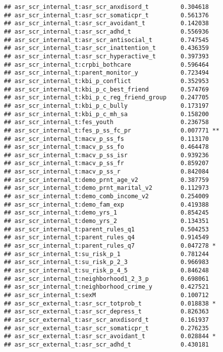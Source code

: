 \documentclass[
]{article}
\begin{document}
\begin{verbatim}
## asr_scr_internal_t:asr_scr_anxdisord_t         0.304618    
## asr_scr_internal_t:asr_scr_somaticpr_t         0.561376    
## asr_scr_internal_t:asr_scr_avoidant_t          0.142038    
## asr_scr_internal_t:asr_scr_adhd_t              0.556936    
## asr_scr_internal_t:asr_scr_antisocial_t        0.747545    
## asr_scr_internal_t:asr_scr_inattention_t       0.436359    
## asr_scr_internal_t:asr_scr_hyperactive_t       0.397393    
## asr_scr_internal_t:crpbi_bothcare              0.596464    
## asr_scr_internal_t:parent_monitor_y            0.723494    
## asr_scr_internal_t:kbi_p_conflict              0.352953    
## asr_scr_internal_t:kbi_p_c_best_friend         0.574769    
## asr_scr_internal_t:kbi_p_c_reg_friend_group    0.247705    
## asr_scr_internal_t:kbi_p_c_bully               0.173197    
## asr_scr_internal_t:kbi_p_c_mh_sa               0.158200    
## asr_scr_internal_t:fes_youth                   0.236758    
## asr_scr_internal_t:fes_p_ss_fc_pr              0.007771 ** 
## asr_scr_internal_t:macv_p_ss_fs                0.113170    
## asr_scr_internal_t:macv_p_ss_fo                0.464478    
## asr_scr_internal_t:macv_p_ss_isr               0.939236    
## asr_scr_internal_t:macv_p_ss_fr                0.859207    
## asr_scr_internal_t:macv_p_ss_r                 0.842084    
## asr_scr_internal_t:demo_prnt_age_v2            0.387759    
## asr_scr_internal_t:demo_prnt_marital_v2        0.112973    
## asr_scr_internal_t:demo_comb_income_v2         0.254009    
## asr_scr_internal_t:demo_fam_exp                0.419388    
## asr_scr_internal_t:demo_yrs_1                  0.854245    
## asr_scr_internal_t:demo_yrs_2                  0.134351    
## asr_scr_internal_t:parent_rules_q1             0.504253    
## asr_scr_internal_t:parent_rules_q4             0.914549    
## asr_scr_internal_t:parent_rules_q7             0.047278 *  
## asr_scr_internal_t:su_risk_p_1                 0.781244    
## asr_scr_internal_t:su_risk_p_2_3               0.966983    
## asr_scr_internal_t:su_risk_p_4_5               0.846248    
## asr_scr_internal_t:neighborhood1_2_3_p         0.698061    
## asr_scr_internal_t:neighborhood_crime_y        0.427521    
## asr_scr_internal_t:sexM                        0.100712    
## asr_scr_external_t:asr_scr_totprob_t           0.018838 *  
## asr_scr_external_t:asr_scr_depress_t           0.826363    
## asr_scr_external_t:asr_scr_anxdisord_t         0.161937    
## asr_scr_external_t:asr_scr_somaticpr_t         0.276235    
## asr_scr_external_t:asr_scr_avoidant_t          0.028844 *  
## asr_scr_external_t:asr_scr_adhd_t              0.430181    

\end{verbatim}
\end{document}
